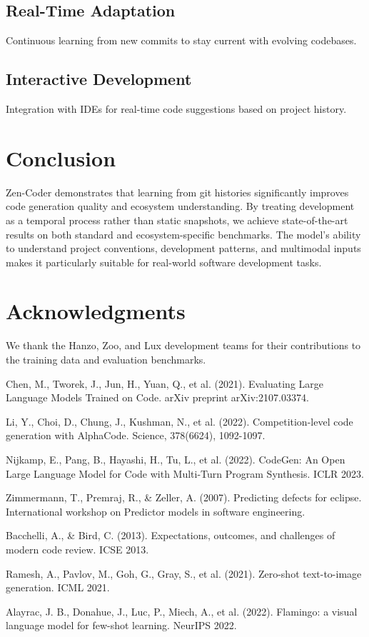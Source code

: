 \documentclass[11pt,a4paper]{article}
\begin{document}
\subsection{Real-Time Adaptation}
Continuous learning from new commits to stay current with evolving codebases.

\subsection{Interactive Development}
Integration with IDEs for real-time code suggestions based on project history.

\section{Conclusion}

Zen-Coder demonstrates that learning from git histories significantly improves code generation quality and ecosystem understanding. By treating development as a temporal process rather than static snapshots, we achieve state-of-the-art results on both standard and ecosystem-specific benchmarks. The model's ability to understand project conventions, development patterns, and multimodal inputs makes it particularly suitable for real-world software development tasks.

\section*{Acknowledgments}
We thank the Hanzo, Zoo, and Lux development teams for their contributions to the training data and evaluation benchmarks.


\begin{thebibliography}{99}

Chen, M., Tworek, J., Jun, H., Yuan, Q., et al. (2021).
Evaluating Large Language Models Trained on Code.
arXiv preprint arXiv:2107.03374.

Li, Y., Choi, D., Chung, J., Kushman, N., et al. (2022).
Competition-level code generation with AlphaCode.
Science, 378(6624), 1092-1097.

Nijkamp, E., Pang, B., Hayashi, H., Tu, L., et al. (2022).
CodeGen: An Open Large Language Model for Code with Multi-Turn Program Synthesis.
ICLR 2023.

Zimmermann, T., Premraj, R., \& Zeller, A. (2007).
Predicting defects for eclipse.
International workshop on Predictor models in software engineering.

Bacchelli, A., \& Bird, C. (2013).
Expectations, outcomes, and challenges of modern code review.
ICSE 2013.

Ramesh, A., Pavlov, M., Goh, G., Gray, S., et al. (2021).
Zero-shot text-to-image generation.
ICML 2021.

Alayrac, J. B., Donahue, J., Luc, P., Miech, A., et al. (2022).
Flamingo: a visual language model for few-shot learning.
NeurIPS 2022.

\end{thebibliography}
\end{document}
